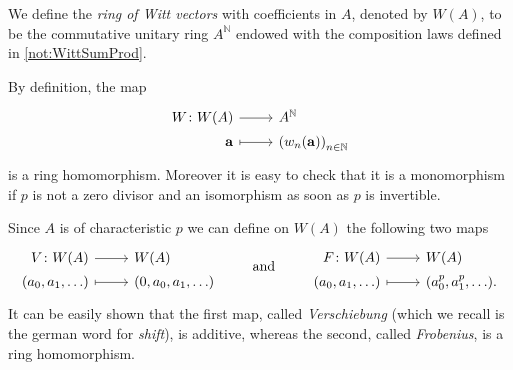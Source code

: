 \begin{defn}
	We define the \emph{ring of Witt vectors} with coefficients in $A$,
	denoted by $W(A)$, to be the commutative unitary ring $A^{\mathbb{N}}$
	endowed with the composition laws defined in \cref{not:WittSumProd}.
\end{defn}


\begin{rem}[]
	By definition, the map
	\begin{equation*}
	\begin{tikzcd}[row sep = 0ex
		,/tikz/column 1/.append style={anchor=base east}
		,/tikz/column 2/.append style={anchor=base west}]
		W\colon W(A) \arrow[r, "", rightarrow] &
		A^{\mathbb{N}} \\
		\mathbf{a} \arrow[r, "", mapsto] & 
		\left( w_n(\mathbf{a}) \right)_{n \in \mathbb{N}}
	\end{tikzcd}
	\end{equation*} 
	is a ring homomorphism.
	Moreover it is easy to check that it is 
	a monomorphism if $p$ is not a zero divisor and
	an isomorphism as soon as $p$ is invertible. 
\end{rem}


\begin{defn}
	Since $A$ is of characteristic $p$ we can define on $W(A)$ the following two
	maps
	\begin{equation*}
	\begin{tikzcd}[row sep = 0ex
		,/tikz/column 1/.append style={anchor=base east}
		,/tikz/column 2/.append style={anchor=base west}]
		V\colon W(A) \arrow[r, "", rightarrow] &
		W(A) \\
		(a_0, a_1, \ldots) \arrow[r, "", mapsto] & 
		(0, a_0, a_1, \ldots)
	\end{tikzcd}
	\qquad \text{ and } \qquad
	\begin{tikzcd}[row sep = 0ex
		,/tikz/column 1/.append style={anchor=base east}
		,/tikz/column 2/.append style={anchor=base west}]
		F\colon W(A) \arrow[r, "", rightarrow] &
		W(A) \\
		(a_0, a_1, \ldots) \arrow[r, "", mapsto] & 
		(a_0^p, a_1^p, \ldots)
	.\end{tikzcd}
	\end{equation*} 
	It can be easily shown that the first map, called \emph{Verschiebung}
	(which we recall is the german word for \emph{shift}), 
	is additive, whereas the second, called \emph{Frobenius},
	is a ring homomorphism.
\end{defn}


